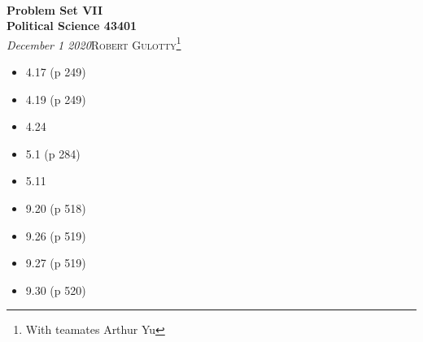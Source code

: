 \documentclass[12pt]{article}
\begin{document}
{\noindent\Huge\bf  \\[0.5\baselineskip] {\selectfont  Problem Set VII}         }\\[2\baselineskip] %
{ {\bf {}\selectfont Political Science 43401}\\ {\textit{\selectfont     December 1 2020}}}\hfill   {\large \textsc{Robert Gulotty}\footnote{With teamates Arthur Yu}} %
\\[1.4\baselineskip] 





\begin{itemize}
\item 4.17 (p 249)
\item 4.19 (p 249)
\item 4.24
\item 5.1 (p 284)
\item 5.11
\item 9.20 (p 518)
\item 9.26 (p 519)
\item 9.27 (p 519)
\item 9.30 (p 520)
\end{itemize}



 
\end{document}
